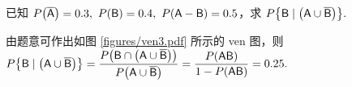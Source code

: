 \begin{example}
    已知 $P\qty(\overline{\mathsf{A}})=0.3,~P(\mathsf{B})=0.4,~P(\mathsf{A}-\mathsf{B})=0.5$，求 $P\qty{\mathsf{B}\mid \qty(\mathsf{A}\cup\overline{\mathsf{B}})}.$
\end{example}
\begin{solution}
    由题意可作出如图 \ref{figures/ven3.pdf} 所示的 ven 图，则 $P\qty{\mathsf{B}\mid \qty(\mathsf{A}\cup\overline{\mathsf{B}})}=\dfrac{P\qty(\mathsf{B}\cap\qty(\mathsf{A}\cup\overline{\mathsf{B}}))}{P\qty(\mathsf{A}\cup\overline{\mathsf{B}})}=\dfrac{P(\mathsf{AB})}{1-P(\mathsf{AB})}=0.25.$
\end{solution}

% 


